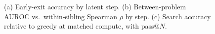 \begin{figure}[t]
\centering
{}
\caption{(a) Early-exit accuracy by latent step. (b) Between-problem AUROC vs.\ within-sibling Spearman $\rho$ by step. (c) Search accuracy relative to greedy at matched compute, with pass@$N$.}
\label{fig:search}
\end{figure}
